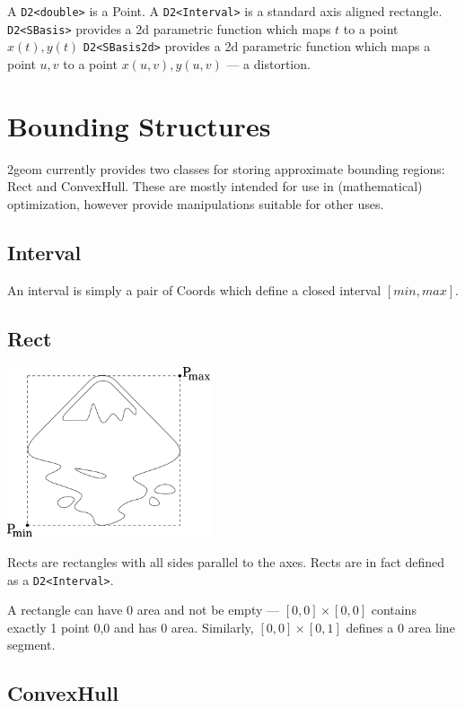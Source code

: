 \documentclass[openany]{book}
\newcommand{\code}[1]{\textsf{#1}}
\begin{document}
A \verb|D2<double>| is a \code{Point}.  A \verb|D2<Interval>| is a standard axis aligned rectangle.
\verb|D2<SBasis>| provides a 2d parametric function which maps $t$ to a point $x(t), y(t)$
\verb|D2<SBasis2d>| provides a 2d parametric function which maps a point $u,v$ to a point $x(u,v), y(u,v)$ --- a distortion.

\section{Bounding Structures}

2geom currently provides two classes for storing approximate bounding
regions: \code{Rect} and \code{ConvexHull}.  These are mostly intended
for use in (mathematical) optimization, however provide manipulations suitable for
other uses.

\subsection{Interval}

An interval is simply a pair of Coords which define a closed interval $[min, max]$.

\subsection{Rect}

\includegraphics[height=50mm]{media/rect.png}

\code{Rect}s are rectangles with all sides parallel to the axes. 
\code{Rect}s are in fact defined as a \verb|D2<Interval>|.

A rectangle can have 0 area and not be empty --- $[0,0] \times [0,0]$ contains exactly 1 point 0,0 and has 0 area.  Similarly, $[0,0] \times [0,1]$ defines a 0 area line segment.

\subsection{ConvexHull}
\end{document}
